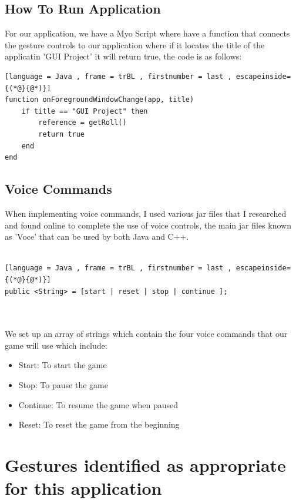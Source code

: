 \documentclass{article}
\begin{document}
\subsection{How To Run Application}

For our application, we have a Myo Script where have a function that connects the gesture controls to our application where if it locates the title of the applicatin 'GUI Project' it will return true, the code is as follows:

\begin{lstlisting}[language = Java , frame = trBL , firstnumber = last , escapeinside={(*@}{@*)}]
function onForegroundWindowChange(app, title)
    if title == "GUI Project" then
        reference = getRoll()
        return true
    end 
end
\end{lstlisting}

\subsection{Voice Commands}

When implementing voice commands, I used various jar files that I researched and found online to complete the use of voice controls, the main jar files known as 'Voce' that can be used by both Java and C++.\\ \\

\begin{lstlisting}[language = Java , frame = trBL , firstnumber = last , escapeinside={(*@}{@*)}]
public <String> = [start | reset | stop | continue ];
\end{lstlisting}
\\ \\
We set up an array of strings which contain the four voice commands that our game will use which include:

\begin{itemize}
    \item Start: To start the game
    \item Stop: To pause the game
    \item Continue: To resume the game when paused
    \item Reset: To reset the game from the beginning
\end{itemize}

\section{Gestures identified as appropriate for this application}
\end{document}
